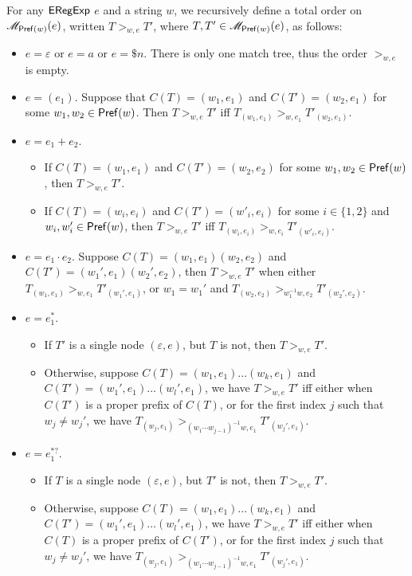   \begin{definition}\label{def-regex-semantics}
  		
  	For any ${\sf ERegExp}$ $e$ and a string $w$, we recursively define a total order on $\mathscr{M}_{\mathsf{Pref}(w)}(e)$, written $T
  	>_{w,e} T'$, where $T, T' \in \mathscr{M}_{\mathsf{Pref}(w)}(e)$, as follows:
  	\begin{itemize}
  		\item $e = \varepsilon$ or $e = a$ or $e = \$ n$. There is only one match tree, thus the
  		order $>_{w, e}$ is empty.
  		
  		\item $e = (e_1)$. Suppose that $C (T) = (w_1, e_1)$ and $C (T') = (w_2, e_1)$ for some $w_1, w_2 \in \mathsf{Pref}(w)$.
  		Then $T >_{w,e} T'$ iff $T_{(w_1, e_1)} >_{w, e_1} T'_{(w_2, e_1)}$.
  		
  		\item $e = e_1 + e_2$.
  		\begin{itemize}
  			\item If $C (T) = (w_1, e_1)$ and $C (T') = (w_2, e_2)$ for some $w_1, w_2 \in \mathsf{Pref}(w)$, then $T >_{w,e} T'$.
%  			
  			\item If $C (T) = (w_i, e_i)$ and $C (T') = (w'_i, e_i)$ for some $i \in \{ 1,
  			2 \}$ and $w_i, w'_i \in \mathsf{Pref}(w)$, then $T >_{w,e} T'$ iff $T_{(w_i, e_i)} >_{w, e_i} T'_{(w'_i, e_i)}$.
  		\end{itemize}
  		\item $e = e_1 \cdot e_2$. Suppose $C (T) = (w_1, e_1) (w_2, e_2)$ and $C (T') =
  		(w_1', e_1) (w_2', e_2)$, then $T >_{w,e} T'$ when either $T_{(w_1, e_1)} >_{w, e_1}
  		T'_{(w_1', e_1)}$, or $w_1 = w_1'$ and $T_{(w_2, e_2)} >_{w_1^{-1}w, e_2} T'_{(w_2', e_2)}$.
%  		
  		\item $e = e_1^{\ast}$. 
		\begin{itemize}
		\item If $T' $ is  a single node $(\varepsilon, e)$, but $T$ is not, then $T >_{w, e} T'$.
  		\item Otherwise, suppose $C(T) = (w_1, e_1) \ldots (w_k, e_1)$ and $C (T') =
  		(w_1', e_1) \ldots (w_l', e_1)$, we have $T >_{w,e} T'$ iff either when $C (T')$
  		is a proper prefix of $C (T)$, or for the first index $j$ such that $w_j
  		\neq w_j'$, we have $T_{(w_j, e_1)} >_{(w_1\cdots w_{j-1})^{-1}w, e_1} T'_{(w_j', e_1)}$.
		\end{itemize}
%
  		\item $e = e_1^{\ast?}$. 
		\begin{itemize}
		\item If $T$ is  a single node  $(\varepsilon, e)$, but $T'$ is not, then $T >_{w, e} T'$.
  		\item Otherwise, suppose $C(T) = (w_1, e_1) \ldots (w_k, e_1)$ and $C (T') =
  		(w_1', e_1) \ldots (w_l', e_1)$, we have $T >_{w,e} T'$ iff either when $C (T)$
  		is a proper prefix of $C (T')$, or for the first index $j$ such that $w_j
  		\neq w_j'$, we have $T_{(w_j, e_1)} >_{(w_1\cdots w_{j-1})^{-1}w, e_1} T'_{(w_j', e_1)}$.
		\end{itemize}
  	\end{itemize}
  	

\end{definition}
